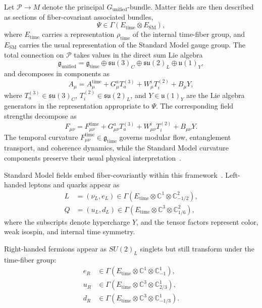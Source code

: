 \documentclass[11pt]{article}
\begin{document}
Let \( \mathcal{P} \to M \) denote the principal \( G_{\mathrm{unified}} \)-bundle. Matter fields are then described as sections of fiber-covariant associated bundles,
\begin{equation}
\Psi \in \Gamma(E_{\mathrm{time}} \otimes E_{\mathrm{SM}}),
\end{equation}
where \( E_{\mathrm{time}} \) carries a representation \( \rho_{\mathrm{time}} \) of the internal time-fiber group, and \( E_{\mathrm{SM}} \) carries the usual representation of the Standard Model gauge group. The total connection on \( \mathcal{P} \) takes values in the direct sum Lie algebra
\begin{equation}
\mathfrak{g}_{\mathrm{unified}} = \mathfrak{g}_{\mathrm{time}} \oplus \mathfrak{su}(3)_C \oplus \mathfrak{su}(2)_L \oplus \mathfrak{u}(1)_Y,
\end{equation}
and decomposes in components as
\begin{equation}
A_\mu = A^{\mathrm{time}}_\mu + G^a_\mu T^{(3)}_a + W^i_\mu T^{(2)}_i + B_\mu Y,
\end{equation}
where \( T^{(3)}_a \in \mathfrak{su}(3)_C \), \( T^{(2)}_i \in \mathfrak{su}(2)_L \), and \( Y \in \mathfrak{u}(1)_Y \) are the Lie algebra generators in the representation appropriate to \( \Psi \). The corresponding field strengths decompose as
\begin{equation}
F_{\mu\nu} = F^{\mathrm{time}}_{\mu\nu} + G^a_{\mu\nu} T^{(3)}_a + W^i_{\mu\nu} T^{(2)}_i + B_{\mu\nu} Y.
\end{equation}
The temporal curvature \( F^{\mathrm{time}}_{\mu\nu} \in \mathfrak{g}_{\mathrm{time}} \) governs modular flow, entanglement transport, and coherence dynamics, while the Standard Model curvature components preserve their usual physical interpretation~\cite{casini2011entanglement}.

Standard Model fields embed fiber-covariantly within this framework~\cite{connes1996standard, chamseddine2007spectral}. Left-handed leptons and quarks appear as
\begin{align}
L &= (\nu_L, e_L) \in \Gamma\left(E_{\mathrm{time}} \otimes \mathbb{C}^1 \otimes \mathbb{C}^2_{-1/2}\right), \\
Q &= (u_L, d_L) \in \Gamma\left(E_{\mathrm{time}} \otimes \mathbb{C}^3 \otimes \mathbb{C}^2_{1/6}\right),
\end{align}
where the subscripts denote hypercharge \( Y \), and the tensor factors represent color, weak isospin, and internal time symmetry.

Right-handed fermions appear as \( SU(2)_L \) singlets but still transform under the time-fiber group:
\begin{align}
e_R &\in \Gamma\left(E_{\mathrm{time}} \otimes \mathbb{C}^1 \otimes \mathbb{C}^1_{-1}\right), \\
u_R &\in \Gamma\left(E_{\mathrm{time}} \otimes \mathbb{C}^3 \otimes \mathbb{C}^1_{2/3}\right), \\
d_R &\in \Gamma\left(E_{\mathrm{time}} \otimes \mathbb{C}^3 \otimes \mathbb{C}^1_{-1/3}\right).
\end{align}
\end{document}
